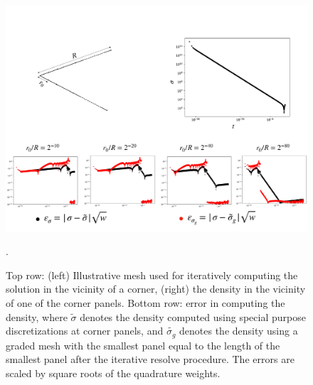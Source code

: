 \begin{figure}
\begin{center}
\includegraphics[width=\linewidth]{media/density}
\caption{Top row: (left) Illustrative mesh used for iteratively computing the solution in the vicinity of a corner, (right) the density in the vicinity of one of the corner panels. Bottom row: error in computing the density, where $\tilde{\sigma}$ denotes the density computed using special purpose discretizations at corner panels, and $\tilde{\sigma_{g}}$ denotes the density using a graded mesh with the smallest panel equal to the length of the smallest panel after the iterative resolve procedure. The errors are scaled by square roots of the quadrature weights.    }.
\end{center}
\label{fig:dens-error}
\end{figure}

